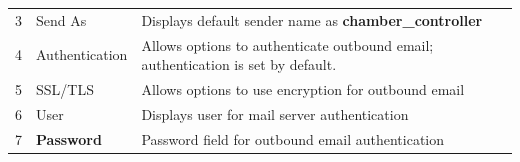 \begin{longtable}[]{@{}|l|l|l|@{}}
\begin{minipage}[t]{0.04\columnwidth}
3\strut
\end{minipage} & \begin{minipage}[t]{0.23\columnwidth}\raggedright
Send As\strut
\end{minipage} & \begin{minipage}[t]{0.65\columnwidth}\raggedright
Displays default sender name as \textbf{chamber\_controller}\strut
\end{minipage}\tabularnewline
\begin{minipage}[t]{0.04\columnwidth}\raggedright
4\strut
\end{minipage} & \begin{minipage}[t]{0.23\columnwidth}\raggedright
Authentication\strut
\end{minipage} & \begin{minipage}[t]{0.65\columnwidth}\raggedright
Allows options to authenticate outbound email; authentication is set by
default.\strut
\end{minipage}\tabularnewline
\begin{minipage}[t]{0.04\columnwidth}\raggedright
5\strut
\end{minipage} & \begin{minipage}[t]{0.23\columnwidth}\raggedright
SSL/TLS\strut
\end{minipage} & \begin{minipage}[t]{0.65\columnwidth}\raggedright
Allows options to use encryption for outbound email\strut
\end{minipage}\tabularnewline
\begin{minipage}[t]{0.04\columnwidth}\raggedright
6\strut
\end{minipage} & \begin{minipage}[t]{0.23\columnwidth}\raggedright
User\strut
\end{minipage} & \begin{minipage}[t]{0.65\columnwidth}\raggedright
Displays user for mail server authentication\strut
\end{minipage}\tabularnewline
\begin{minipage}[t]{0.04\columnwidth}\raggedright
7\strut
\end{minipage} & \begin{minipage}[t]{0.23\columnwidth}\raggedright
{\bf{Password}}\strut
\end{minipage} & \begin{minipage}[t]{0.65\columnwidth}\raggedright
Password field for outbound email authentication\strut
\end{minipage}\tabularnewline

\end{longtable}
